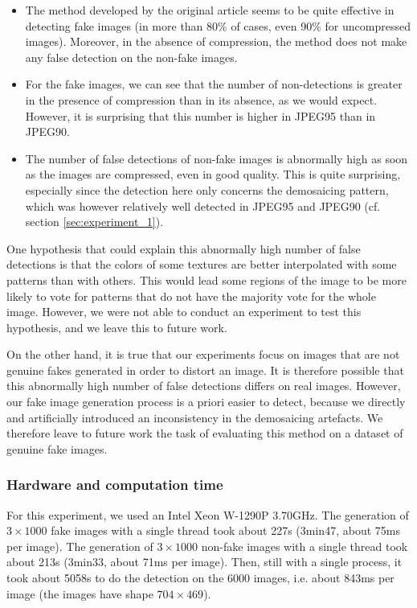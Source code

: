 \documentclass[sigconf, nonacm]{acmart}
\begin{document}
\begin{itemize}
    \item The method developed by the original article seems to be quite effective in detecting fake images (in more than 80\% of cases, even 90\% for uncompressed images). Moreover, in the absence of compression, the method does not make any false detection on the non-fake images.
    \item For the fake images, we can see that the number of non-detections is greater in the presence of compression than in its absence, as we would expect. However, it is surprising that this number is higher in JPEG95 than in JPEG90.
    \item The number of false detections of non-fake images is abnormally high as soon as the images are compressed, even in good quality. This is quite surprising, especially since the detection here only concerns the demosaicing pattern, which was however relatively well detected in JPEG95 and JPEG90 (cf. section \ref{sec:experiment_1}).
\end{itemize}

One hypothesis that could explain this abnormally high number of false detections is that the colors of some textures are better interpolated with some patterns than with others. This would lead some regions of the image to be more likely to vote for patterns that do not have the majority vote for the whole image. However, we were not able to conduct an experiment to test this hypothesis, and we leave this to future work.

On the other hand, it is true that our experiments focus on images that are not genuine fakes generated in order to distort an image. It is therefore possible that this abnormally high number of false detections differs on real images. However, our fake image generation process is a priori easier to detect, because we directly and artificially introduced an inconsistency in the demosaicing artefacts. We therefore leave to future work the task of evaluating this method on a dataset of genuine fake images.

\subsubsection{Hardware and computation time} For this experiment, we used an Intel Xeon W-1290P 3.70GHz. The generation of $3\times1000$ fake images with a single thread took about 227s (3min47, about 75ms per image). The generation of $3\times1000$ non-fake images with a single thread took about 213s (3min33, about 71ms per image). Then, still with a single process, it took about 5058s to do the detection on the 6000 images, i.e. about 843ms per image (the images have shape $704\times469$).
\end{document}
